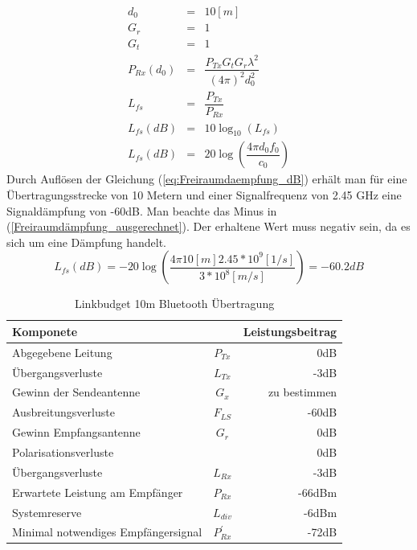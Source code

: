 \begin{eqnarray}
    	d_{0} 	&=& 10 [m] \\ \label{eq:d0_LinkBudget}
    G_r		&=&  1 \\ \label{eq:Gr_LinkBudget}
	G_t 		&=&  1 \\ \label{eq:Gt_LinkBudget}
    P_{Rx}(d_0) 	&=& \dfrac{P_{Tx}G_t G_r\lambda^2}{(4\pi)^2 d_0^2} \\ \label{eq:Prx_LinkBudget}
    L_{fs} 		&=& \dfrac{P_{Tx}}{P_{Rx}} \\ \label{eq:Freiraumdaempfung}
    L_{fs}(dB) 	&=& 10\log_{10}(L_{fs}) \\ \label{eq:Freiraumdaempfung_dB}
    L_{fs}(dB) 	&=& 20\log(\dfrac{4\pi d_0 f_0}{c_0}) \label{eq:Freiraumdaempfung_dB_aufgelöst} 
\end{eqnarray}
Durch Auflösen der Gleichung (\ref{eq:Freiraumdaempfung_dB}) erhält man für eine Übertragungsstrecke von 10 Metern und einer Signalfrequenz von 2.45 GHz eine Signaldämpfung von -60dB. Man beachte das Minus in (\ref{Freiraumdämpfung_ausgerechnet}). Der erhaltene Wert muss negativ sein, da es sich um eine Dämpfung handelt.
\begin{equation}\label{Freiraumdämpfung_ausgerechnet}
    L_{fs}(dB) = -20\log(\dfrac{4\pi 10[m] 2.45*10^9 [1/s] }{3*10^8[m/s]}) =-60.2dB
\end{equation}

\begin{table}[!ht]
  \centering
  \begin{tabular}{l c r} \toprule 
  Komponete                  	& 			&Leistungsbeitrag  \\ \midrule
  Abgegebene Leitung    			&$P_{Tx}$ 	& 0dB       \\
  Übergangsverluste              &$L_{Tx}$	& -3dB       \\
  Gewinn der Sendeantenne    	&$G_{x}$		& zu bestimmen        \\
  Ausbreitungsverluste   		& $F_{LS}$	& -60dB        \\
  Gewinn Empfangsantenne  		& $G_{r}$	& 0dB           \\
  Polarisationsverluste          & 	& 0dB            \\
  Übergangsverluste              & $L_{Rx}$	& -3dB            \\
  Erwartete Leistung am Empfänger & $P_{Rx}$  & -66dBm \cite{CC2541} \\ \midrule
  Systemreserve        			 & $L_{div}$&-6dBm \\ 
  Minimal notwendiges Empfängersignal &$P_{Rx}^{'}$ & -72dB \\ \bottomrule
  \end{tabular}
  \caption{Linkbudget 10m Bluetooth Übertragung}
  \label{tab:Linkbudget}
\end{table}

